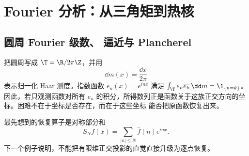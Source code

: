 \section{Fourier 分析：从三角矩到热核}\label{sec:07-02}

\subsection{圆周 Fourier 级数、\Fejer{} 逼近与 Plancherel}\label{subsec:7-2-1}

把圆周写成 $\T=\R/2\pi\Z$，并用
\[
  \dd m(x)=\frac{\dd x}{2\pi}
\]
表示归一化 Haar 测度。指数函数 $e_n(x)=e^{inx}$ 满足
$\int_\T e_n\overline{e_k}\,\dd m=\1_{\{n=k\}}$。因此，若只观测函数对所有
$e_n$ 的积分，所得数列正是函数关于这族正交方向的坐标。困难不在于坐标是否存在，而在于这些坐标
能否把原函数恢复出来。

最先想到的恢复算子是对称部分和
\[
  S_Nf(x)=\sum_{|n|\leq N}\widehat f(n)e^{inx}.
\]
下一个例子说明，不能把有限维正交投影的直觉直接升级为逐点恢复。

